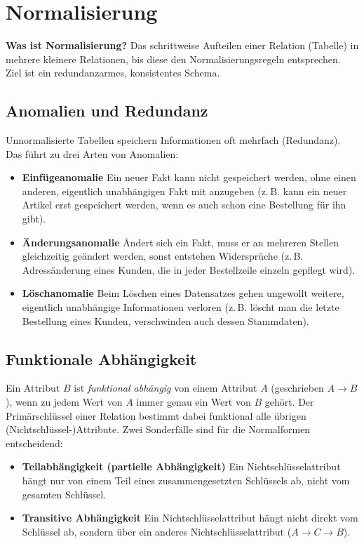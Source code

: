 \section{Normalisierung}
\textbf{Was ist Normalisierung?} Das schrittweise Aufteilen einer Relation (Tabelle) in mehrere kleinere Relationen, bis diese den Normalisierungsregeln entsprechen. Ziel ist ein redundanzarmes, konsistentes Schema.

\subsection{Anomalien und Redundanz}
Unnormalisierte Tabellen speichern Informationen oft mehrfach (Redundanz). Das führt zu drei Arten von Anomalien:
\begin{itemize}
  \item \textbf{Einfügeanomalie} Ein neuer Fakt kann nicht gespeichert werden, ohne einen anderen, eigentlich unabhängigen Fakt mit anzugeben (z.\,B. kann ein neuer Artikel erst gespeichert werden, wenn es auch schon eine Bestellung für ihn gibt).
  \item \textbf{Änderungsanomalie} Ändert sich ein Fakt, muss er an mehreren Stellen gleichzeitig geändert werden, sonst entstehen Widersprüche (z.\,B. Adressänderung eines Kunden, die in jeder Bestellzeile einzeln gepflegt wird).
  \item \textbf{Löschanomalie} Beim Löschen eines Datensatzes gehen ungewollt weitere, eigentlich unabhängige Informationen verloren (z.\,B. löscht man die letzte Bestellung eines Kunden, verschwinden auch dessen Stammdaten).
\end{itemize}

\subsection{Funktionale Abhängigkeit}
Ein Attribut $B$ ist \emph{funktional abhängig} von einem Attribut $A$ (geschrieben $A \rightarrow B$), wenn zu jedem Wert von $A$ immer genau ein Wert von $B$ gehört. Der Primärschlüssel einer Relation bestimmt dabei funktional alle übrigen (Nichtschlüssel-)Attribute. Zwei Sonderfälle sind für die Normalformen entscheidend:
\begin{itemize}
  \item \textbf{Teilabhängigkeit (partielle Abhängigkeit)} Ein Nichtschlüsselattribut hängt nur von einem Teil eines zusammengesetzten Schlüssels ab, nicht vom gesamten Schlüssel.
  \item \textbf{Transitive Abhängigkeit} Ein Nichtschlüsselattribut hängt nicht direkt vom Schlüssel ab, sondern über ein anderes Nichtschlüsselattribut ($A \rightarrow C \rightarrow B$).
\end{itemize}

